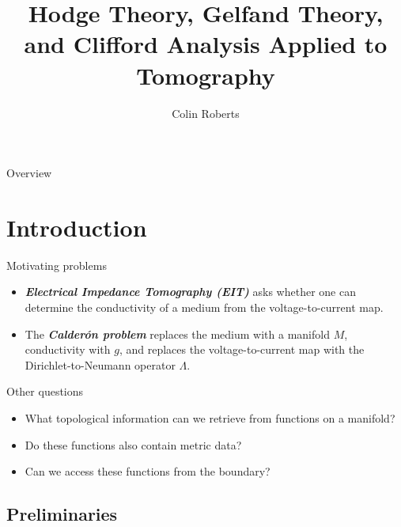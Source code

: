 \documentclass[aspectratio=169,handout]{beamer}
\author{Colin Roberts}
\title{Hodge Theory, Gelfand Theory, and Clifford Analysis Applied to Tomography}
\subtitle{}
\newcommand\boldgreen[1]{\textcolor{lighter_csu_green}{\emph{\textbf{#1}}}}
\begin{document}
\color{white}

\begin{frame}{Overview}
\tableofcontents
\end{frame}

\section{Introduction}

\begin{frame}{Motivating problems}
\vfill
\begin{itemize}
\pause
\item \boldgreen{Electrical Impedance Tomography (EIT)} asks whether one can determine the conductivity of a medium from the voltage-to-current map.
\pause
\item The \boldgreen{Calder\'on problem} replaces the medium with a manifold $M$, conductivity with $g$, and replaces the voltage-to-current map with the Dirichlet-to-Neumann operator $\Lambda$.
\end{itemize}
\vfill
\end{frame}

\begin{frame}{Other questions}
\vfill
    \begin{itemize}
        \pause
        \item What topological information can we retrieve from functions on a manifold?

        \pause
        \item Do these functions also contain metric data?

        \pause
        \item Can we access these functions from the boundary?
    \end{itemize}
\vfill
\end{frame}

\subsection{Preliminaries}
\end{document}
